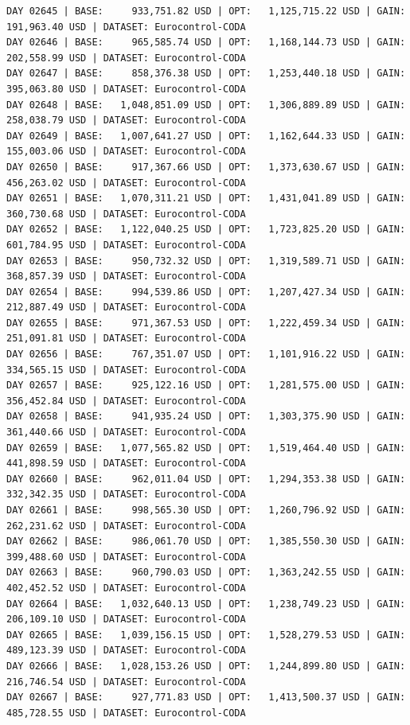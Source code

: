 \documentclass[11pt,a4paper]{article}
\begin{document}
\begin{verbatim}
DAY 02645 | BASE:     933,751.82 USD | OPT:   1,125,715.22 USD | GAIN: 191,963.40 USD | DATASET: Eurocontrol-CODA
DAY 02646 | BASE:     965,585.74 USD | OPT:   1,168,144.73 USD | GAIN: 202,558.99 USD | DATASET: Eurocontrol-CODA
DAY 02647 | BASE:     858,376.38 USD | OPT:   1,253,440.18 USD | GAIN: 395,063.80 USD | DATASET: Eurocontrol-CODA
DAY 02648 | BASE:   1,048,851.09 USD | OPT:   1,306,889.89 USD | GAIN: 258,038.79 USD | DATASET: Eurocontrol-CODA
DAY 02649 | BASE:   1,007,641.27 USD | OPT:   1,162,644.33 USD | GAIN: 155,003.06 USD | DATASET: Eurocontrol-CODA
DAY 02650 | BASE:     917,367.66 USD | OPT:   1,373,630.67 USD | GAIN: 456,263.02 USD | DATASET: Eurocontrol-CODA
DAY 02651 | BASE:   1,070,311.21 USD | OPT:   1,431,041.89 USD | GAIN: 360,730.68 USD | DATASET: Eurocontrol-CODA
DAY 02652 | BASE:   1,122,040.25 USD | OPT:   1,723,825.20 USD | GAIN: 601,784.95 USD | DATASET: Eurocontrol-CODA
DAY 02653 | BASE:     950,732.32 USD | OPT:   1,319,589.71 USD | GAIN: 368,857.39 USD | DATASET: Eurocontrol-CODA
DAY 02654 | BASE:     994,539.86 USD | OPT:   1,207,427.34 USD | GAIN: 212,887.49 USD | DATASET: Eurocontrol-CODA
DAY 02655 | BASE:     971,367.53 USD | OPT:   1,222,459.34 USD | GAIN: 251,091.81 USD | DATASET: Eurocontrol-CODA
DAY 02656 | BASE:     767,351.07 USD | OPT:   1,101,916.22 USD | GAIN: 334,565.15 USD | DATASET: Eurocontrol-CODA
DAY 02657 | BASE:     925,122.16 USD | OPT:   1,281,575.00 USD | GAIN: 356,452.84 USD | DATASET: Eurocontrol-CODA
DAY 02658 | BASE:     941,935.24 USD | OPT:   1,303,375.90 USD | GAIN: 361,440.66 USD | DATASET: Eurocontrol-CODA
DAY 02659 | BASE:   1,077,565.82 USD | OPT:   1,519,464.40 USD | GAIN: 441,898.59 USD | DATASET: Eurocontrol-CODA
DAY 02660 | BASE:     962,011.04 USD | OPT:   1,294,353.38 USD | GAIN: 332,342.35 USD | DATASET: Eurocontrol-CODA
DAY 02661 | BASE:     998,565.30 USD | OPT:   1,260,796.92 USD | GAIN: 262,231.62 USD | DATASET: Eurocontrol-CODA
DAY 02662 | BASE:     986,061.70 USD | OPT:   1,385,550.30 USD | GAIN: 399,488.60 USD | DATASET: Eurocontrol-CODA
DAY 02663 | BASE:     960,790.03 USD | OPT:   1,363,242.55 USD | GAIN: 402,452.52 USD | DATASET: Eurocontrol-CODA
DAY 02664 | BASE:   1,032,640.13 USD | OPT:   1,238,749.23 USD | GAIN: 206,109.10 USD | DATASET: Eurocontrol-CODA
DAY 02665 | BASE:   1,039,156.15 USD | OPT:   1,528,279.53 USD | GAIN: 489,123.39 USD | DATASET: Eurocontrol-CODA
DAY 02666 | BASE:   1,028,153.26 USD | OPT:   1,244,899.80 USD | GAIN: 216,746.54 USD | DATASET: Eurocontrol-CODA
DAY 02667 | BASE:     927,771.83 USD | OPT:   1,413,500.37 USD | GAIN: 485,728.55 USD | DATASET: Eurocontrol-CODA

\end{verbatim}
\end{document}
